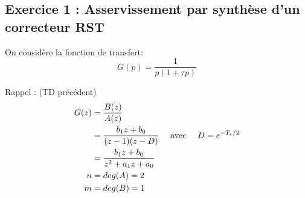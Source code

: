 \documentclass[../main.tex]{subfiles}
\begin{document}
\subsection*{Exercice 1 : Asservissement par synthèse d'un correcteur RST}
On considère la fonction de transfert: \[G(p) = \frac{1}{p(1+\tau p)}\]

Rappel : (TD précédent)
\begin{align*}
G(z) & = \frac{B(z)}{A(z)} \\
& = \frac{b_1z+b_0}{(z-1)(z-D)} \quad\text{ avec }\quad D=e^{-T_e/2}\\
& =\frac{b_1z+b_0}{z^2+a_1z+a_0}  \\
n & = deg(A) = 2 \\
m & = deg(B) = 1 \\
\end{align*}
\end{document}
